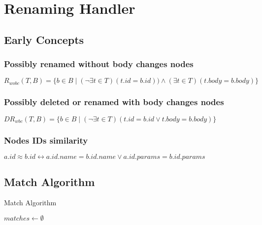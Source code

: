 \documentclass[../../Algorithms.tex]{subfiles}
\begin{document}
    \section{Renaming Handler}
    \subsection{Early Concepts}

    \subsubsection{Possibly renamed without body changes nodes}

    $R_{wobc}(T, B) = \{ b \in B \mid (\lnot \exists t \in T) (t.id = b.id)) \land (\exists t \in T) (t.body = b.body)\}$

    \subsubsection{Possibly deleted or renamed with body changes nodes}

    $DR_{wbc}(T, B) = \{ b \in B \mid (\lnot \exists t \in T) (t.id = b.id \lor t.body = b.body)\}$

    \subsubsection{Nodes IDs similarity}

    $a.id \approx b.id \leftrightarrow a.id.name = b.id.name \lor a.id.params = b.id.params$

    \subsection{Match Algorithm}
    
    \begin{algorithm}[H]
        \caption{Match Algorithm}
        \SetAlgoLined

        
        \BlankLine
        
        $matches \leftarrow \emptyset$\;

        \BlankLine
    \end{algorithm}
\end{document}
